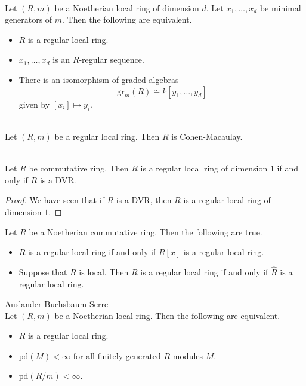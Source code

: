 \documentclass[a4paper]{article}
\begin{document}
\begin{prp}{}{}\\
Let $(R,m)$ be a Noetherian local ring of dimension $d$. Let $x_1,\dots,x_d$ be minimal generators of $m$. Then the following are equivalent. 
\begin{itemize}
\item $R$ is a regular local ring. 
\item $x_1,\dots,x_d$ is an $R$-regular sequence. 
\item There is an isomorphism of graded algebras $$\text{gr}_m(R)\cong k[y_1,\dots,y_d]$$ given by $[x_i]\mapsto y_i$. 
\end{itemize}
\end{prp}

\begin{crl}{}{}\\
Let $(R,m)$ be a regular local ring. Then $R$ is Cohen-Macaulay. 
\end{crl}

\begin{lmm}{}{}\\
Let $R$ be commutative ring. Then $R$ is a regular local ring of dimension $1$ if and only if $R$ is a DVR. 
\begin{proof}
We have seen that if $R$ is a DVR, then $R$ is a regular local ring of dimension $1$. 
\end{proof}
\end{lmm}

\begin{lmm}{}{} Let $R$ be a Noetherian commutative ring. Then the following are true. 
\begin{itemize}
\item $R$ is a regular local ring if and only if $R[x]$ is a regular local ring. 
\item Suppose that $R$ is local. Then $R$ is a regular local ring if and only if $\widehat{R}$ is a regular local ring. 
\end{itemize}
\end{lmm}

\begin{thm}{Auslander-Buchsbaum-Serre}{}\\
Let $(R,m)$ be a Noetherian local ring. Then the following are equivalent. 
\begin{itemize}
\item $R$ is a regular local ring. 
\item $\text{pd}(M)<\infty$ for all finitely generated $R$-modules $M$. 
\item $\text{pd}(R/m)<\infty$. 
\end{itemize}
\end{thm}
\end{document}
